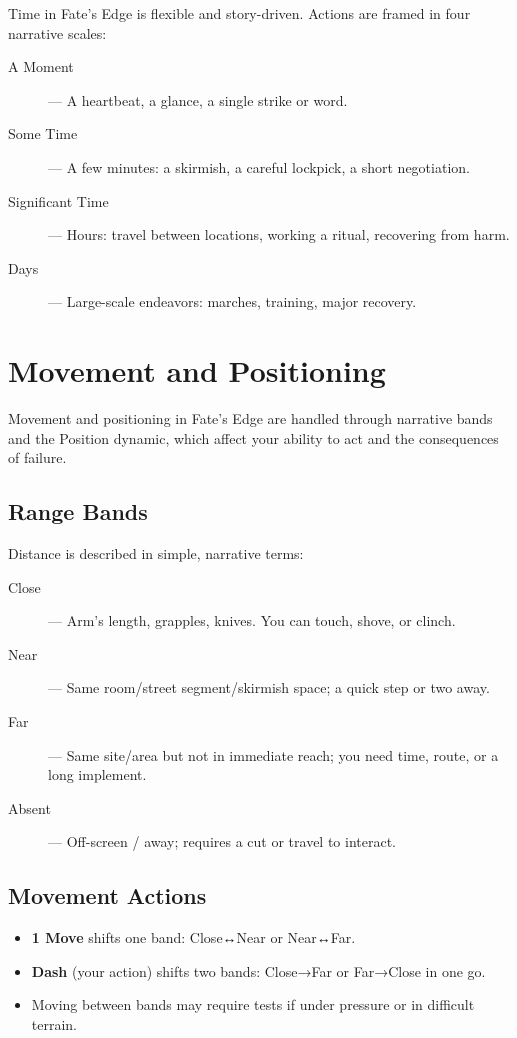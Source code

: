 Time in Fate's Edge is flexible and story-driven. Actions are framed in four narrative scales:

\begin{description}
  \item[A Moment]  — A heartbeat, a glance, a single strike or word.
  \item[Some Time]  — A few minutes: a skirmish, a careful lockpick, a short negotiation.
  \item[Significant Time]  — Hours: travel between locations, working a ritual, recovering from harm.
  \item[Days]  — Large-scale endeavors: marches, training, major recovery.
\end{description}

\section{Movement and Positioning}

Movement and positioning in Fate's Edge are handled through narrative bands and the Position dynamic, which affect your ability to act and the consequences of failure.

\subsection*{Range Bands}

Distance is described in simple, narrative terms:
\begin{description}
  \item[Close]  — Arm's length, grapples, knives. You can touch, shove, or clinch.
  \item[Near]  — Same room/street segment/skirmish space; a quick step or two away.
  \item[Far]  — Same site/area but not in immediate reach; you need time, route, or a long implement.
  \item[Absent]  — Off-screen / away; requires a cut or travel to interact.
\end{description}

\subsection*{Movement Actions}
\begin{itemize}
  \item \textbf{1 Move} shifts one band: Close↔Near or Near↔Far.
  \item \textbf{Dash} (your action) shifts two bands: Close→Far or Far→Close in one go.
  \item Moving between bands may require tests if under pressure or in difficult terrain.
\end{itemize}

